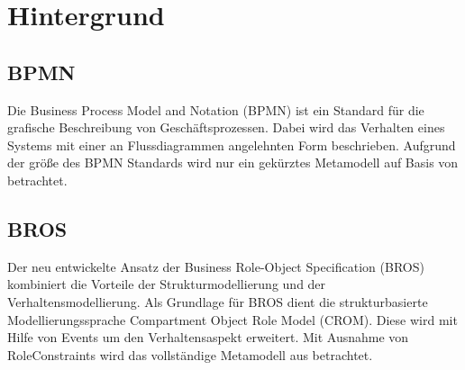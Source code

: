 \chapter{Hintergrund}

\section{BPMN}

Die Business Process Model and Notation (BPMN) ist ein Standard für die grafische Beschreibung von Geschäftsprozessen.
Dabei wird das Verhalten eines Systems mit einer an Flussdiagrammen angelehnten Form beschrieben.
Aufgrund der größe des BPMN Standards wird nur ein gekürztes Metamodell auf Basis von \cite{Loja2010} betrachtet.

\section{BROS}

Der neu entwickelte Ansatz der Business Role-Object Specification (BROS) kombiniert die Vorteile der Strukturmodellierung und der Verhaltensmodellierung.
Als Grundlage für BROS dient die strukturbasierte Modellierungssprache Compartment Object Role Model (CROM).
Diese wird mit Hilfe von Events um den Verhaltensaspekt erweitert.
Mit Ausnahme von RoleConstraints wird das vollständige Metamodell aus \cite{Schoen} betrachtet.
